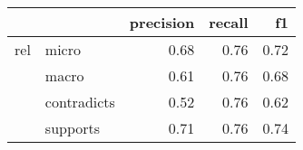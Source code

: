 \begin{tabular}{llrrr}
\toprule
    &          &  precision &  recall &   f1 \\
\midrule
rel & micro &       0.68 &    0.76 & 0.72 \\
    & macro &       0.61 &    0.76 & 0.68 \\
    & contradicts &       0.52 &    0.76 & 0.62 \\
    & supports &       0.71 &    0.76 & 0.74 \\
\bottomrule
\end{tabular}
